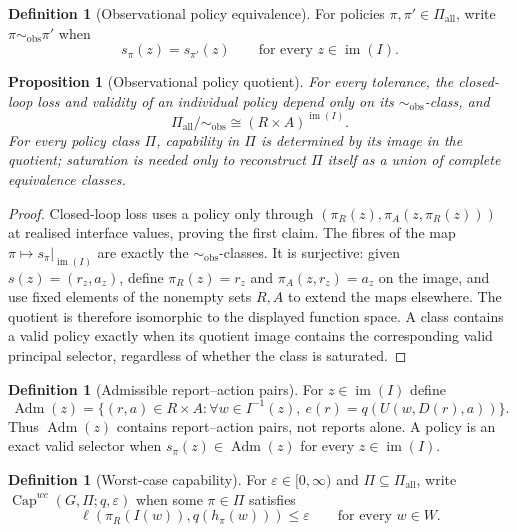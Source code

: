\documentclass[11pt]{article}
\theoremstyle{plain}
\newtheorem{proposition}[theorem]{Proposition}
\theoremstyle{definition}
\newtheorem{definition}[theorem]{Definition}
\theoremstyle{remark}
\newcommand{\im}{\operatorname{im}}
\newcommand{\Capability}{\operatorname{Cap}}
\newcommand{\Adm}{\operatorname{Adm}}
\newcommand{\eps}{\varepsilon}
\begin{document}
\begin{definition}[Observational policy equivalence]\label{def:gauge}
For policies $\pi,\pi'\in\Pi_{\mathrm{all}}$, write
$\pi\sim_{\mathrm{obs}}\pi'$ when
\[
s_\pi(z)=s_{\pi'}(z)\qquad\text{for every }z\in\im(I).
\]
\end{definition}

\begin{proposition}[Observational policy quotient]\label{prop:gauge}
For every tolerance, the closed-loop loss and validity of an individual policy
depend only on its $\sim_{\mathrm{obs}}$-class, and
\[
\Pi_{\mathrm{all}}/\!\sim_{\mathrm{obs}}
\cong (R\times A)^{\im(I)}.
\]
For every policy class $\Pi$, capability in $\Pi$ is determined by its image in
the quotient; saturation is needed only to reconstruct $\Pi$ itself as a union
of complete equivalence classes.
\end{proposition}

\begin{proof}
Closed-loop loss uses a policy only through
$(\pi_R(z),\pi_A(z,\pi_R(z)))$ at realised interface values, proving the first
claim. The fibres of the map
$\pi\mapsto s_\pi|_{\im(I)}$ are exactly the
$\sim_{\mathrm{obs}}$-classes. It is surjective: given
$s(z)=(r_z,a_z)$, define $\pi_R(z)=r_z$ and
$\pi_A(z,r_z)=a_z$ on the image, and use fixed elements of the nonempty sets
$R,A$ to extend the maps elsewhere. The quotient is therefore isomorphic to the
displayed function space. A class contains a valid policy exactly when its
quotient image contains the corresponding valid principal selector, regardless
of whether the class is saturated.
\end{proof}

\begin{definition}[Admissible report--action pairs]\label{def:admissible-pairs}
For $z\in\im(I)$ define
\[
\Adm(z)=\{(r,a)\in R\times A:
\forall w\in I^{-1}(z),\ e(r)=q(U(w,D(r),a))\}.
\]
Thus $\Adm(z)$ contains report--action pairs, not reports alone. A policy is an
exact valid selector when $s_\pi(z)\in\Adm(z)$ for every $z\in\im(I)$.
\end{definition}

\begin{definition}[Worst-case capability]\label{def:cap}
For $\eps\in[0,\infty)$ and $\Pi\subseteq\Pi_{\mathrm{all}}$, write
$\Capability^{wc}(G,\Pi;q,\eps)$ when some $\pi\in\Pi$ satisfies
\[
\ell(\pi_R(I(w)),q(h_\pi(w)))\le\eps
\qquad\text{for every }w\in W.
\]
\end{definition}
\end{document}
